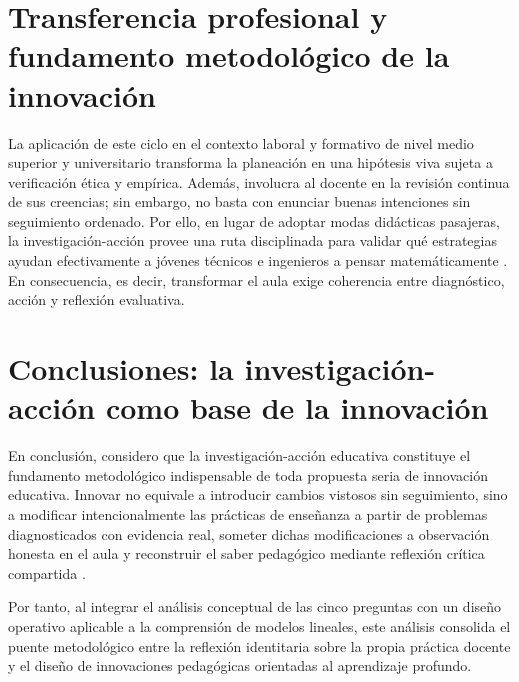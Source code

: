 \documentclass[spanish,letterpaper,oneside]{article}
\begin{document}
\section{Transferencia profesional y fundamento metodológico de la innovación}
La aplicación de este ciclo en el contexto laboral y formativo de nivel medio superior y universitario transforma la planeación en una hipótesis viva sujeta a verificación ética y empírica. Además, involucra al docente en la revisión continua de sus creencias; sin embargo, no basta con enunciar buenas intenciones sin seguimiento ordenado. Por ello, en lugar de adoptar modas didácticas pasajeras, la investigación-acción provee una ruta disciplinada para validar qué estrategias ayudan efectivamente a jóvenes técnicos e ingenieros a pensar matemáticamente \citep{eef2017mathematics}. En consecuencia, es decir, transformar el aula exige coherencia entre diagnóstico, acción y reflexión evaluativa.

\clearpage
\section{Conclusiones: la investigación-acción como base de la innovación}
En conclusión, considero que la investigación-acción educativa constituye el fundamento metodológico indispensable de toda propuesta seria de innovación educativa. Innovar no equivale a introducir cambios vistosos sin seguimiento, sino a modificar intencionalmente las prácticas de enseñanza a partir de problemas diagnosticados con evidencia real, someter dichas modificaciones a observación honesta en el aula y reconstruir el saber pedagógico mediante reflexión crítica compartida \citep{restrepo2004investigacion}.

Por tanto, al integrar el análisis conceptual de las cinco preguntas con un diseño operativo aplicable a la comprensión de modelos lineales, este análisis consolida el puente metodológico entre la reflexión identitaria sobre la propia práctica docente y el diseño de innovaciones pedagógicas orientadas al aprendizaje profundo.
\end{document}

